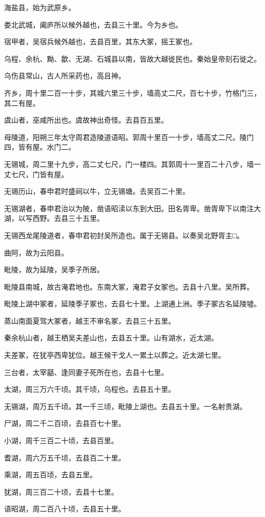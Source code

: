 \documentclass[12pt,UTF8]{ctexbook}
\begin{document}
海盐县，始为武原乡。

娄北武城，阖庐所以候外越也，去县三十里。今为乡也。

宿甲者，吴宿兵候外越也，去县百里，其东大冢，摇王冢也。

乌程、余杭、黝、歙、无湖、石城县以南，皆故大越徙民也。秦始皇帝刻石徙之。

乌伤县常山，古人所采药也，高且神。

齐乡，周十里二百一十步，其城六里三十步，墙高丈二尺，百七十步，竹格门三，其二有屋。

虞山者，巫咸所出也。虞故神出奇怪。去县百五里。

母陵道，阳朔三年太守周君造陵道语昭。郭周十里百一十步，墙高丈二尺。陵门四，皆有屋。水门二。

无锡城，周二里十九步，高二丈七尺，门一楼四。其郭周十一里百二十八步，墙一丈七尺，门皆有屋。

无锡历山，春申君时盛祠以牛，立无锡塘。去吴百二十里。

无锡湖者，春申君治以为陂，凿语昭渎以东到大田。田名胥卑。凿胥卑下以南注大湖，以写西野。去县三十五里。

无锡西龙尾陵道者，春申君初封吴所造也。属于无锡县。以奏吴北野胥主□。

曲阿，故为云阳县。

毗陵，故为延陵，吴季子所居。

毗陵县南城，故古淹君地也。东南大冢，淹君子女冢也。去县十八里。吴所葬。

毗陵上湖中冢者，延陵季子冢也，去县七十里。上湖通上洲。季子冢古名延陵墟。

蒸山南面夏驾大冢者，越王不审名冢，去县三十五里。

秦余杭山者，越王栖吴夫差山也，去县五十里。山有湖水，近太湖。

夫差冢，在犹亭西卑犹位。越王候干戈人一累土以葬之。近太湖七里。

三台者，太宰嚭、逢同妻子死所在也，去县十七里。

太湖，周三万六千顷。其千顷，乌程也。去县五十里。

无锡湖，周万五千顷。其一千三顷，毗陵上湖也。去县五十里。一名射贵湖。

尸湖，周二千二百顷，去县百七十里。

小湖，周千三百二十顷，去县百里。

耆湖，周六万五千顷，去县百二十里。

乘湖，周五百顷，去县五里。

犹湖，周三百二十顷，去县十七里。

语昭湖，周二百八十顷，去县五十里。
\end{document}
